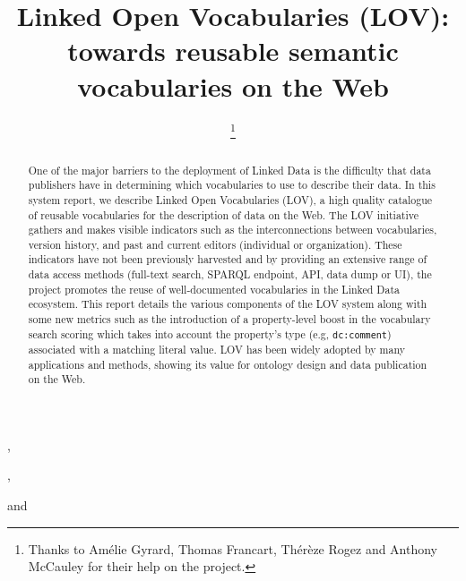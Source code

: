 \documentclass{iosart2c}
\begin{document}
\begin{frontmatter}                        %

%
\title{Linked Open Vocabularies (LOV): towards reusable semantic vocabularies on the Web}




\author[A]{ \thanks{Thanks to Am\'elie Gyrard, Thomas Francart, Th\'er\`{e}ze Rogez and Anthony McCauley for their help on the project.}},
\author[B]{ },
\author[C]{ }
and
\author[D]{ }
\address[A]{Fujitsu (Ireland) Limited, Swords, Co. Dublin, Ireland\\
E-mail: pierre-yves.vandenbussche@ie.fujitsu.com}
\address[B]{Mondeca, 35 boulevard de Strasbourg, 75010 Paris, France\\
E-mail: ghislain.atemezing@mondeca.com}
\address[C]{Ontology Engineering Group (OEG), 
Universidad Polit\'ecnica de Madrid, Madrid, Spain\\
E-mail: mpoveda@fi.upm.es}
\address[D]{Mondeca, 35 boulevard de Strasbourg, 75010 Paris, France
\\
E-mail: bernard.vatant@mondeca.com}


\begin{abstract}

One of the major barriers to the deployment of 
Linked Data is the difficulty that data publishers have in determining which vocabularies to use to describe their data. In this system report, we describe Linked Open Vocabularies (LOV), a high quality catalogue 
of reusable vocabularies for the description of data on the Web. The LOV initiative gathers and makes visible indicators such as the interconnections between vocabularies, version history, and past and current editors 
(individual or organization). These indicators have not been previously harvested and by providing an extensive range of data access methods (full-text search, SPARQL endpoint, API, data dump or UI), the project promotes the reuse of well-documented vocabularies in the Linked Data ecosystem. This report details the various components of the LOV system along with some new metrics  such as the introduction of a property-level boost 
in the vocabulary search scoring which takes into account the property's type (e.g, \texttt{dc:comment}) associated with a matching literal value. 
LOV has been widely adopted by many applications and methods, showing its value for ontology design and data publication on the Web. 


\end{abstract}
\end{frontmatter}
\end{document}
